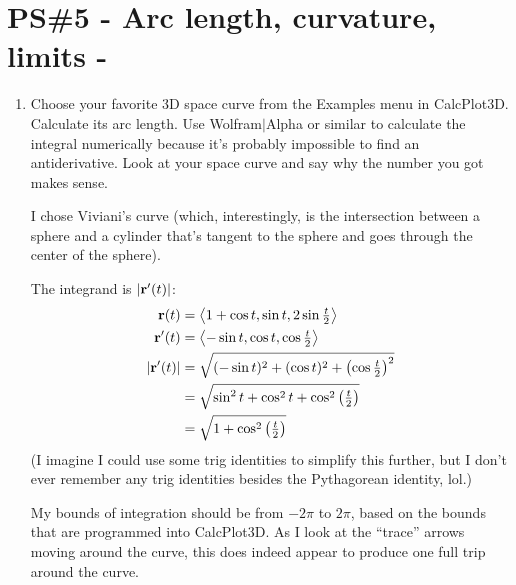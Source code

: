 


%


\allowdisplaybreaks
\section{PS\#5 - Arc length, curvature, limits -  }

\begin{enumerate}[leftmargin=0pt]
    \item Choose your favorite 3D space curve from the Examples menu in CalcPlot3D. Calculate its arc length. Use Wolfram$|$Alpha or similar to calculate the integral numerically because it's probably impossible to find an antiderivative. Look at your space curve and say why the number you got makes sense.
        
    \begin{red}
    I chose Viviani's curve (which, interestingly, is the intersection between a sphere and a cylinder that's tangent to the sphere and goes through the center of the sphere).
    
    The integrand is $|\mathbf{r}'(t)|$:
    \begin{align*}
        \mathbf{r}(t) &= \left\langle 1 + \cos t, \sin t, 2 \sin \tfrac{t}{2} \right\rangle \\
        \mathbf{r}'(t) &= \left\langle -\sin t, \cos t, \cos \tfrac{t}{2} \right\rangle \\
        |\mathbf{r}'(t)| &= \sqrt{ 
        (-\sin t)^2 + (\cos t)^2 + \left(\cos \tfrac{t}{2}\right)^2
        }\\
        &= \sqrt{\sin^2 t + \cos^2 t + \cos^2\left(\tfrac{t}{2}\right)} \\
        &= \sqrt{1 + \cos^2\left(\tfrac{t}{2}\right)}
    \end{align*}
    (I imagine I could use some trig identities to simplify this further, but I don't ever remember any trig identities besides the Pythagorean identity, lol.)
    
    My bounds of integration should be from $-2\pi$ to $2\pi$, based on the bounds that are programmed into CalcPlot3D. As I look at the ``trace'' arrows moving around the curve, this does indeed appear to produce one full trip around the curve.
    

\end{red}
\end{enumerate}
